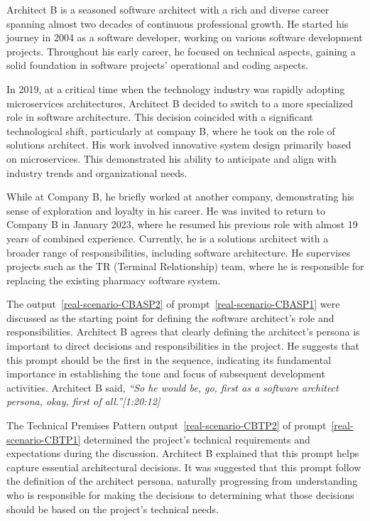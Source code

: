 
Architect B is a seasoned software architect with a rich and diverse career spanning almost two decades of continuous professional growth. He started his journey in 2004 as a software developer, working on various software development projects. Throughout his early career, he focused on technical aspects, gaining a solid foundation in software projects' operational and coding aspects.

In 2019, at a critical time when the technology industry was rapidly adopting microservices architectures, Architect B decided to switch to a more specialized role in software architecture. This decision coincided with a significant technological shift, particularly at company B, where he took on the role of solutions architect. His work involved innovative system design primarily based on microservices. This demonstrated his ability to anticipate and align with industry trends and organizational needs.

While at Company B, he briefly worked at another company, demonstrating his sense of exploration and loyalty in his career. He was invited to return to Company B in January 2023, where he resumed his previous role with almost 19 years of combined experience. Currently, he is a solutions architect with a broader range of responsibilities, including software architecture. He supervises projects such as the TR (Terminal Relationship) team, where he is responsible for replacing the existing pharmacy software system.



The output~\ref{real-scenario-CBASP2} of prompt~\ref{real-scenario-CBASP1} were discussed as the starting point for defining the software architect's role and responsibilities. Architect B agrees that clearly defining the architect's persona is important to direct decisions and responsibilities in the project. He suggests that this prompt should be the first in the sequence, indicating its fundamental importance in establishing the tone and focus of subsequent development activities. Architect B said, \textit{``So he would be, go, first as a software architect persona, okay, first of all.''[1:20:12]}


The Technical Premises Pattern output~\ref{real-scenario-CBTP2} of prompt~\ref{real-scenario-CBTP1} determined the project's technical requirements and expectations during the discussion. Architect B explained that this prompt helps capture essential architectural decisions. It was suggested that this prompt follow the definition of the architect persona, naturally progressing from understanding who is responsible for making the decisions to determining what those decisions should be based on the project's technical needs.


